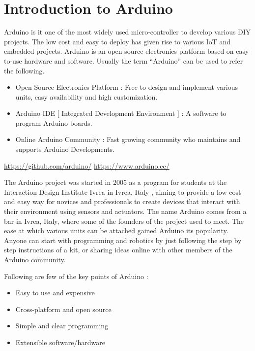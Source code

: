 \chapter{Introduction to Arduino}
\label{ch:arduino-uno}
Arduino is it one of the most widely used micro-controller to develop various DIY projects. The low cost and easy to deploy has given rise to various IoT and embedded projects. Arduino is an open source electronics platform based on easy-to-use hardware and software. Usually the term “Arduino” can be used to refer the following.
\begin{itemize}
    \item Open Source Electronics Platform : Free to design and implement various units, easy availability and high customization. 
    \item Arduino IDE [ Integrated Development Environment ] : A software to program Arduino boards.
    \item Online Arduino Community : Fast growing community who maintains and supports Arduino Developments.

\end{itemize}

\url{https://github.com/arduino/} \hspace{0.5cm} \url{https://www.arduino.cc/}

\par The Arduino project was started in 2005 as a program for students at the Interaction Design Institute Ivrea in Ivrea, Italy , aiming to provide a low-cost and easy way for novices and professionals to create devices that interact with their environment using sensors and actuators. The name Arduino comes from a bar in Ivrea, Italy, where some of the founders of the project used to meet. The ease at which various units can be attached gained Arduino its popularity. Anyone can start with programming and robotics by just following the step by step instructions of a kit, or sharing ideas online with other members of the Arduino community.

Following are few of the key points of Arduino :

\begin{itemize}
    \item Easy to use and expensive
    \item Cross-platform and open source
    \item Simple and clear programming
    \item  Extensible software/hardware
\end{itemize}

